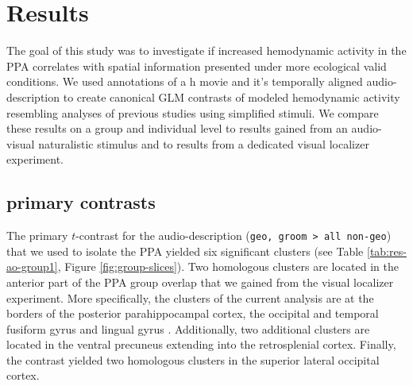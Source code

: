 \documentclass[english]{article}
\begin{document}
\section{Results}

The goal of this study was to investigate if increased hemodynamic activity in
the PPA correlates with spatial information presented under more ecological
valid conditions.
We used annotations of a \unit[2]{h} movie and it's temporally aligned
audio-description to create canonical GLM contrasts of modeled hemodynamic
activity resembling analyses of previous studies using simplified stimuli.
We compare these results on a group and individual level to results gained from
an audio-visual naturalistic stimulus and to results from a dedicated visual
localizer experiment.



\subsection{primary contrasts}




The primary $t$-contrast for the audio-description (\texttt{geo, groom > all
non-geo}) that we used to isolate the PPA yielded six significant clusters (see
Table \ref{tab:res-ao-group1}, Figure \ref{fig:group-slices}).
Two homologous clusters are located in the anterior part of the PPA group
overlap that we gained from the visual localizer experiment.
More specifically, the clusters of the current analysis are at the borders of
the posterior parahippocampal cortex, the occipital and temporal fusiform gyrus
and lingual gyrus .
Additionally, two additional clusters are located in the ventral precuneus
extending into the retrosplenial cortex.
Finally, the contrast yielded two homologous clusters in the superior lateral
occipital cortex.
\end{document}
